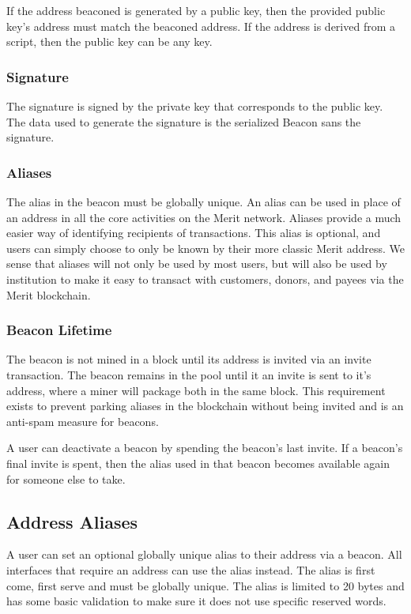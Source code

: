 \documentclass{article}
\begin{document}
If the address beaconed is generated by a public key, then the provided public key's
address must match the beaconed address.  If the address is derived from a script,
then the public key can be any key.

\subsubsection{Signature}

The signature is signed by the private key that corresponds to the public key.
The data used to generate the signature is the serialized Beacon sans the signature.

\subsubsection{Aliases}
The alias in the beacon must be globally unique.  An alias can be used in place of an
address in all the core activities on the Merit network.  Aliases provide a much easier way 
of identifying recipients of transactions.  This alias is optional, and users can simply 
choose to only be known by their more classic Merit address.  We sense that aliases 
will not only be used by most users, but will also be used by institution to make
it easy to transact with customers, donors, and payees via the Merit blockchain.

\subsubsection{Beacon Lifetime}
The beacon is not mined in a block until its address is invited via an \gls{invite}
transaction.  The beacon remains in the pool until it an invite is sent to it's
address, where a miner will package both in the same block.  This requirement
exists to prevent parking aliases in the blockchain without being invited and
is an anti-spam measure for beacons.

A user can deactivate a beacon by spending the beacon's last invite.  If a beacon's
final invite is spent, then the alias used in that beacon becomes available again
for someone else to take.

\subsection{Address Aliases}

A user can set an optional globally unique alias to their address via a beacon.
All interfaces that require an address can use the alias instead.
The alias is first come, first serve and must be globally unique.
The alias is limited to 20 bytes and has some basic validation to make sure it
does not use specific reserved words.
\end{document}
